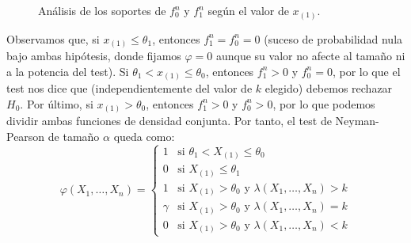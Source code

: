 \begin{ejercicio}
\begin{description}
\begin{figure}[h]
            \caption{Análisis de los soportes de $f_0^n$ y $f_1^n$ según el valor de $x_{(1)}$.}
            \label{fig:densidades_conjuntas_ej7.6.2}
        \end{figure}

        Observamos que, si $x_{(1)} \leq \theta_1$, entonces $f_1^n = f_0^n = 0$ (suceso de probabilidad nula bajo ambas hipótesis, donde fijamos $\varphi = 0$ aunque su valor no afecte al tamaño ni a la potencia del test). Si $\theta_1 < x_{(1)} \leq \theta_0$, entonces $f_1^n > 0$ y $f_0^n = 0$, por lo que el test nos dice que (independientemente del valor de $k$ elegido) debemos rechazar $H_0$. Por último, si $x_{(1)} > \theta_0$, entonces $f_1^n > 0$ y $f_0^n > 0$, por lo que podemos dividir ambas funciones de densidad conjunta. Por tanto, el test de Neyman-Pearson de tamaño $\alpha$ queda como:
        \begin{equation*}
            \varphi(X_1, \ldots, X_n) = \left\{\begin{array}{ll}
                1 & \text{si\ } \theta_1 < X_{(1)} \leq \theta_0 \\
                0 & \text{si\ } X_{(1)} \leq \theta_1 \\
                1 & \text{si\ } X_{(1)} > \theta_0 \text{\ y\ } \lambda(X_1, \ldots, X_n) > k \\
                \gamma & \text{si\ } X_{(1)} > \theta_0 \text{\ y\ } \lambda(X_1, \ldots, X_n) = k \\
                0 & \text{si\ } X_{(1)} > \theta_0 \text{\ y\ } \lambda(X_1, \ldots, X_n) < k
            \end{array}\right.
        \end{equation*}


\end{description}
\end{ejercicio}

